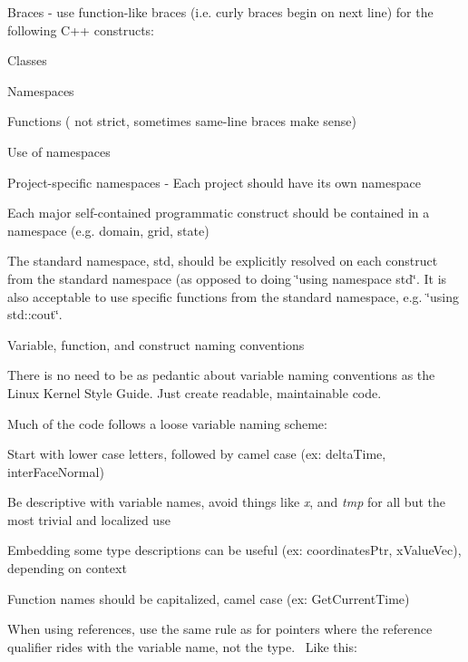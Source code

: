 \begin{DoxyItemize}
\item Braces -\/ use function-\/like braces (i.\+e. curly braces begin on next line) for the following C++ constructs\+:
\begin{DoxyItemize}
\item Classes
\item Namespaces
\item Functions ( not strict, sometimes same-\/line braces make sense)
\end{DoxyItemize}
\item Use of namespaces
\begin{DoxyItemize}
\item Project-\/specific namespaces -\/ Each project should have its own namespace
\item Each major self-\/contained programmatic construct should be contained in a namespace (e.\+g. domain, grid, state)
\item The standard namespace, std, should be explicitly resolved on each construct from the standard namespace (as opposed to doing \char`\"{}using namespace std\char`\"{}. It is also acceptable to use specific functions from the standard namespace, e.\+g. \char`\"{}using std\+::cout\char`\"{}.
\end{DoxyItemize}
\item Variable, function, and construct naming conventions
\begin{DoxyItemize}
\item There is no need to be as pedantic about variable naming conventions as the Linux Kernel Style Guide. Just create readable, maintainable code.
\item Much of the code follows a loose variable naming scheme\+:
\begin{DoxyItemize}
\item Start with lower case letters, followed by camel case (ex\+: delta\+Time, inter\+Face\+Normal)
\item Be descriptive with variable names, avoid things like {\itshape x}, and {\itshape tmp} for all but the most trivial and localized use
\item Embedding some type descriptions can be useful (ex\+: coordinates\+Ptr, x\+Value\+Vec), depending on context
\item Function names should be capitalized, camel case (ex\+: Get\+Current\+Time)
\end{DoxyItemize}
\item When using references, use the same rule as for pointers where the reference qualifier rides with the variable name, not the type.~\newline
Like this\+:~\newline


\end{DoxyItemize}
\end{DoxyItemize}
